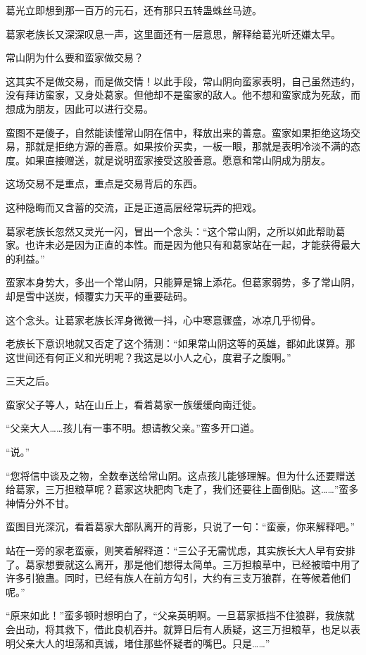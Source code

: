 \begin{this_body}
葛光立即想到那一百万的元石，还有那只五转蛊蛛丝马迹。

葛家老族长又深深叹息一声，这里面还有一层意思，解释给葛光听还嫌太早。

常山阴为什么要和蛮家做交易？

这其实不是做交易，而是做交情！以此手段，常山阴向蛮家表明，自己虽然违约，没有拜访蛮家，又身处葛家。但他却不是蛮家的敌人。他不想和蛮家成为死敌，而想成为朋友，因此可以进行交易。

蛮图不是傻子，自然能读懂常山阴在信中，释放出来的善意。蛮家如果拒绝这场交易，那就是拒绝方源的善意。如果按价买卖，一板一眼，那就是表明冷淡不满的态度。如果直接赠送，就是说明蛮家接受这股善意。愿意和常山阴成为朋友。

这场交易不是重点，重点是交易背后的东西。

这种隐晦而又含蓄的交流，正是正道高层经常玩弄的把戏。

葛家老族长忽然又灵光一闪，冒出一个念头：“这个常山阴，之所以如此帮助葛家。也许未必是因为正直的本性。而是因为他只有和葛家站在一起，才能获得最大的利益。”

蛮家本身势大，多出一个常山阴，只能算是锦上添花。但葛家弱势，多了常山阴，却是雪中送炭，倾覆实力天平的重要砝码。

这个念头。让葛家老族长浑身微微一抖，心中寒意骤盛，冰凉几乎彻骨。

老族长下意识地就又否定了这个猜测：“如果常山阴这等的英雄，都如此谋算。那这世间还有何正义和光明呢？我这是以小人之心，度君子之腹啊。”

三天之后。

蛮家父子等人，站在山丘上，看着葛家一族缓缓向南迁徙。

“父亲大人……孩儿有一事不明。想请教父亲。”蛮多开口道。

“说。”

“您将信中谈及之物，全数奉送给常山阴。这点孩儿能够理解。但为什么还要赠送给葛家，三万担粮草呢？葛家这块肥肉飞走了，我们还要往上面倒贴。这……”蛮多神情分外不甘。

蛮图目光深沉，看着葛家大部队离开的背影，只说了一句：“蛮豪，你来解释吧。”

站在一旁的家老蛮豪，则笑着解释道：“三公子无需忧虑，其实族长大人早有安排了。葛家想要就这么离开，那是他们想得太简单。三万担粮草中，已经被暗中用了许多引狼蛊。同时，已经有族人在前方勾引，大约有三支万狼群，在等候着他们呢。”

“原来如此！”蛮多顿时想明白了，“父亲英明啊。一旦葛家抵挡不住狼群，我族就会出动，将其救下，借此良机吞并。就算日后有人质疑，这三万担粮草，也足以表明父亲大人的坦荡和真诚，堵住那些怀疑者的嘴巴。只是……”


\end{this_body}
